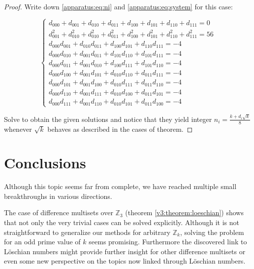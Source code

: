 \documentclass{article}
\theoremstyle{plain}
\theoremstyle{definition}
\theoremstyle{remark}
\begin{document}
			\begin{proof}
				Write down \eqref{apparatus:eq:ni} and \eqref{apparatus:eq:system} for this case:
				
				\begin{equation}
					\begin{cases}
                        d_{000} + d_{001} + d_{010} + d_{011} + d_{100}  + d_{101}  + d_{110}  + d_{111} = 0 \\
                        d_{001}^2 + d_{010}^2 + d_{010}^2 + d_{011}^2 + d_{100}^2 + d_{101}^2 + d_{110}^2 + d_{111}^2 = 56 \\
                        d_{000} d_{001} + d_{010} d_{011} + d_{100} d_{101} +  d_{110} d_{111} = -4 \\
                        d_{000} d_{010} + d_{001} d_{011} + d_{101} d_{110} +  d_{101} d_{111} = -4 \\
                        d_{000} d_{011} + d_{001} d_{010} + d_{100} d_{111} +  d_{101} d_{110} = -4 \\
                        d_{000} d_{100} + d_{001} d_{101} + d_{010} d_{110} +  d_{011} d_{111} = -4 \\
                        d_{000} d_{101} +  d_{001} d_{100} + d_{010} d_{111} + d_{011} d_{110} = -4 \\
                        d_{000} d_{110} + d_{001} d_{111} + d_{010} d_{100} + d_{011} d_{101} = -4 \\
                        d_{000} d_{111} + d_{001} d_{110} + d_{010} d_{101} +  d_{011} d_{100} = -4
					\end{cases}
				\end{equation}
				
				Solve to obtain the given solutions and notice that they yield integer $n_i = \frac{k+d_i \sqrt k}8$ whenever $\sqrt k$ behaves as described in the cases of theorem.
			\end{proof}

	\section{Conclusions}
		Although this topic seems far from complete, we have reached multiple small breakthroughs in various directions.
		
		The case of difference multisets over $\mathbb Z_3$ (theorem \ref{v3:theorem:loeschian}) shows that not only the very trivial cases can be solved explicitly. Although it is not straightforward to generalize our methods for arbitrary $\mathbb Z_k$, solving the problem for an odd prime value of $k$ seems promising. Furthermore the discovered link to Löschian numbers might provide further insight for other difference multisets or even some new perspective on the topics now linked through Löschian numbers.
		
\end{document}
